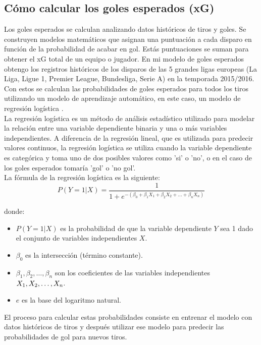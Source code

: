 \subsection{Cómo calcular los goles esperados (xG)}
Los goles esperados se calculan analizando datos históricos de tiros y goles. Se construyen modelos matemáticos que asignan una puntuación a cada disparo en función de la probabilidad de acabar en gol. Estás puntuaciones se suman para obtener el xG total de un equipo o jugador.
En mi modelo de goles esperados obtengo los registros históricos de los disparos de las 5 grandes ligas europeas (La Liga, Ligue 1, Premier League, Bundesliga, Serie A) en la temporada 2015/2016. Con estos se calculan las probabilidades de goles esperados para todos los tiros utilizando un modelo de aprendizaje automático, en este caso, un modelo de regresión logística \cite{regresionLogistica:latex}. \\
La regresión logística es un método de análisis estadístico utilizado para modelar la relación entre una variable dependiente binaria y una o más variables independientes. A diferencia de la regresión lineal, que es utilizada para predecir valores continuos, la regresión logística se utiliza cuando la variable dependiente es categórica y toma uno de dos posibles valores como 'si' o 'no', o en el caso de los goles esperados tomaría 'gol' o 'no gol'. \\
La fórmula de la regresión logística es la siguiente:
\[
P(Y=1|X) = \frac{1}{1 + e^{-(\beta_0 + \beta_1X_1 + \beta_2X_2 + \ldots + \beta_nX_n)}}
\]

donde:
\begin{itemize}
  \item \( P(Y=1|X) \) es la probabilidad de que la variable dependiente \( Y \) sea 1 dado el conjunto de variables independientes \( X \).
  \item \( \beta_0 \) es la intersección (término constante).
  \item \( \beta_1, \beta_2, \ldots, \beta_n \) son los coeficientes de las variables independientes \( X_1, \\ X_2, \ldots, X_n \).
  \item \( e \) es la base del logaritmo natural.
\end{itemize}

El proceso para calcular estas probabilidades consiste en entrenar el modelo con datos históricos de tiros y después utilizar ese modelo para predecir las probabilidades de gol para nuevos tiros. \\

